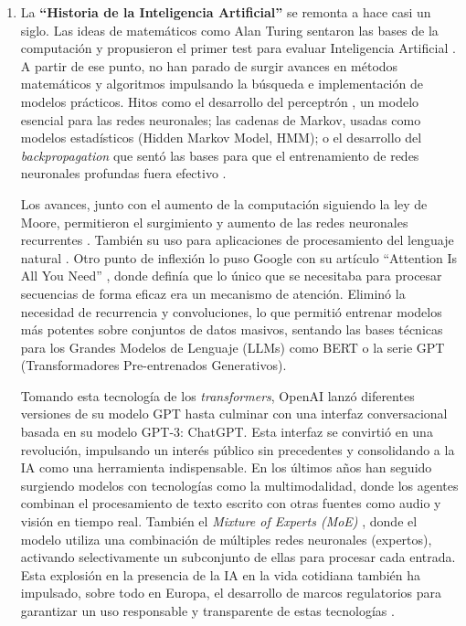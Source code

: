 \begin{enumerate}
	\subsection{Referentes a Inteligencia Artificial}

	\item La \textbf{``Historia de la Inteligencia Artificial''} \label{def12} se remonta a hace casi un siglo. Las ideas de matemáticos como Alan Turing sentaron las bases de la computación y propusieron el primer test para evaluar Inteligencia Artificial \citep{Cheok2023AIHistory}. A partir de ese punto, no han parado de surgir avances en métodos matemáticos y algoritmos impulsando la búsqueda e implementación de modelos prácticos. Hitos como el desarrollo del perceptrón \citep{rosenblatt1958perceptron}, un modelo esencial para las redes neuronales; las cadenas de Markov, usadas como modelos estadísticos (Hidden Markov Model, HMM); o el desarrollo del \textit{backpropagation} que sentó las bases para que el entrenamiento de redes neuronales profundas fuera efectivo \citep{Werbos1974Backpropagation}.

	Los avances, junto con el aumento de la computación siguiendo la ley de Moore, permitieron el surgimiento y aumento de las redes neuronales recurrentes \citep{Hopfield1984RNN}. También su uso para aplicaciones de procesamiento del lenguaje natural \citep{bengio2003neural}. Otro punto de inflexión lo puso Google con su artículo ``Attention Is All You Need'' \citep{vaswani2017attention}, donde definía que lo único que se necesitaba para procesar secuencias de forma eficaz era un mecanismo de atención. Eliminó la necesidad de recurrencia y convoluciones, lo que permitió entrenar modelos más potentes sobre conjuntos de datos masivos, sentando las bases técnicas para los Grandes Modelos de Lenguaje (LLMs) como BERT o la serie GPT (Transformadores Pre-entrenados Generativos).

	Tomando esta tecnología de los \textit{transformers}, OpenAI lanzó diferentes versiones de su modelo GPT hasta culminar con una interfaz conversacional basada en su modelo GPT-3: ChatGPT. Esta interfaz se convirtió en una revolución, impulsando un interés público sin precedentes y consolidando a la IA como una herramienta indispensable. En los últimos años han seguido surgiendo modelos con tecnologías como la multimodalidad, donde los agentes combinan el procesamiento de texto escrito con otras fuentes como audio y visión en tiempo real. También el \textit{Mixture of Experts (MoE)} \citep{Jiang2024Mixtral}, donde el modelo utiliza una combinación de múltiples redes neuronales (expertos), activando selectivamente un subconjunto de ellas para procesar cada entrada. Esta explosión en la presencia de la IA en la vida cotidiana también ha impulsado, sobre todo en Europa, el desarrollo de marcos regulatorios para garantizar un uso responsable y transparente de estas tecnologías \citep{webRIA2024Europa}.


\end{enumerate}
